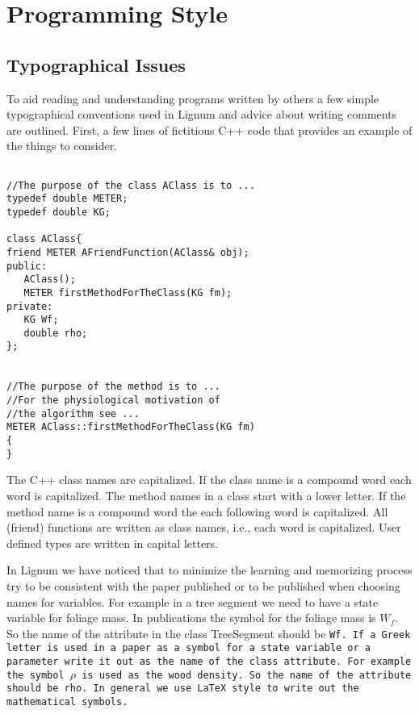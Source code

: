 \section{Programming Style}

\subsection{Typographical Issues}
To  aid reading  and understanding  programs written  by others  a few
simple  typographical  conventions used  in  Lignum  and advice  about
writing comments are  outlined.  First, a few lines  of fictitious C++
code that provides an example of the things to consider.

\begin{verbatim}

//The purpose of the class AClass is to ...
typedef double METER;
typedef double KG;

class AClass{
friend METER AFriendFunction(AClass& obj);
public:
   AClass();
   METER firstMethodForTheClass(KG fm);
private:
   KG Wf;
   double rho;
};


//The purpose of the method is to ...
//For the physiological motivation of 
//the algorithm see ... 
METER AClass::firstMethodForTheClass(KG fm)
{
}
\end{verbatim}

The C++ class names are capitalized.   If the class name is a compound
word each word is capitalized. The  method names in a class start with
a  lower letter.   If the  method  name is  a compound  word the  each
following word is capitalized.   All (friend) functions are written as
class names, i.e.,  each word is capitalized.  User  defined types are
written in capital letters.

In Lignum we have noticed that to minimize the learning and memorizing
process  try  to be  consistent  with the  paper  published  or to  be
published when  choosing names for  variables.  For example in  a tree
segment  we  need to  have  a state  variable  for  foliage mass.   In
publications the symbol for the foliage mass is $W_f$.  So the name of
the  attribute in the  class TreeSegment  should be  \tt Wf\rm.   If a
Greek letter is used in a paper  as a symbol for a state variable or a
parameter  write it  out  as the  name  of the  class attribute.   For
example the symbol $\rho$ is used as the wood density.  So the name of
the attribute should be \tt rho\rm.   In general we use \LaTeX \ style
to write out the mathematical symbols.

